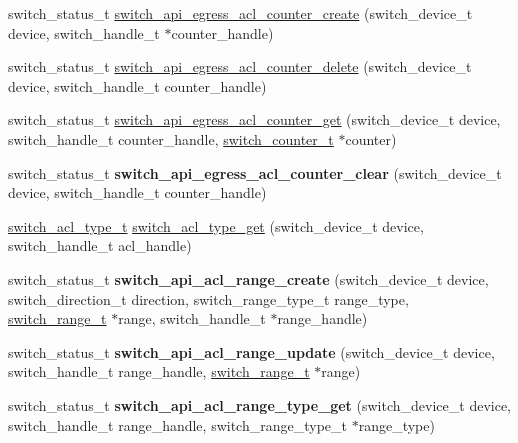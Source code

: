 \begin{DoxyCompactItemize}
\item 
switch\+\_\+status\+\_\+t \hyperlink{group__ACL_ga67485890e9717c55ebfa51f18caf53ad}{switch\+\_\+api\+\_\+egress\+\_\+acl\+\_\+counter\+\_\+create} (switch\+\_\+device\+\_\+t device, switch\+\_\+handle\+\_\+t $\ast$counter\+\_\+handle)
\item 
switch\+\_\+status\+\_\+t \hyperlink{group__ACL_ga97dbfde641a778f4211b245ff1f6dc06}{switch\+\_\+api\+\_\+egress\+\_\+acl\+\_\+counter\+\_\+delete} (switch\+\_\+device\+\_\+t device, switch\+\_\+handle\+\_\+t counter\+\_\+handle)
\item 
switch\+\_\+status\+\_\+t \hyperlink{group__ACL_gad83ec3611518a8fbee8f510dd3140587}{switch\+\_\+api\+\_\+egress\+\_\+acl\+\_\+counter\+\_\+get} (switch\+\_\+device\+\_\+t device, switch\+\_\+handle\+\_\+t counter\+\_\+handle, \hyperlink{structswitch__counter__s}{switch\+\_\+counter\+\_\+t} $\ast$counter)
\item 
\hypertarget{group__ACL_ga754fd217e762872ae156cfaa05e29d49}{switch\+\_\+status\+\_\+t {\bfseries switch\+\_\+api\+\_\+egress\+\_\+acl\+\_\+counter\+\_\+clear} (switch\+\_\+device\+\_\+t device, switch\+\_\+handle\+\_\+t counter\+\_\+handle)}\label{group__ACL_ga754fd217e762872ae156cfaa05e29d49}

\item 
\hyperlink{group__ACL_ga01c3d85a9624b16e65bc9272f210e961}{switch\+\_\+acl\+\_\+type\+\_\+t} \hyperlink{group__ACL_ga54c264be9b711609bd6f30866026105e}{switch\+\_\+acl\+\_\+type\+\_\+get} (switch\+\_\+device\+\_\+t device, switch\+\_\+handle\+\_\+t acl\+\_\+handle)
\item 
\hypertarget{group__ACL_gab9b8f47cf3f38d73650279a892fe1b41}{switch\+\_\+status\+\_\+t {\bfseries switch\+\_\+api\+\_\+acl\+\_\+range\+\_\+create} (switch\+\_\+device\+\_\+t device, switch\+\_\+direction\+\_\+t direction, switch\+\_\+range\+\_\+type\+\_\+t range\+\_\+type, \hyperlink{structswitch__range__}{switch\+\_\+range\+\_\+t} $\ast$range, switch\+\_\+handle\+\_\+t $\ast$range\+\_\+handle)}\label{group__ACL_gab9b8f47cf3f38d73650279a892fe1b41}

\item 
\hypertarget{group__ACL_gab7c6482efe25d4d05a69d1ca9ca2f081}{switch\+\_\+status\+\_\+t {\bfseries switch\+\_\+api\+\_\+acl\+\_\+range\+\_\+update} (switch\+\_\+device\+\_\+t device, switch\+\_\+handle\+\_\+t range\+\_\+handle, \hyperlink{structswitch__range__}{switch\+\_\+range\+\_\+t} $\ast$range)}\label{group__ACL_gab7c6482efe25d4d05a69d1ca9ca2f081}

\item 
\hypertarget{group__ACL_ga6a8f7c1d2d768bd0ea0147aa97769d06}{switch\+\_\+status\+\_\+t {\bfseries switch\+\_\+api\+\_\+acl\+\_\+range\+\_\+type\+\_\+get} (switch\+\_\+device\+\_\+t device, switch\+\_\+handle\+\_\+t range\+\_\+handle, switch\+\_\+range\+\_\+type\+\_\+t $\ast$range\+\_\+type)}\label{group__ACL_ga6a8f7c1d2d768bd0ea0147aa97769d06}


\end{DoxyCompactItemize}
